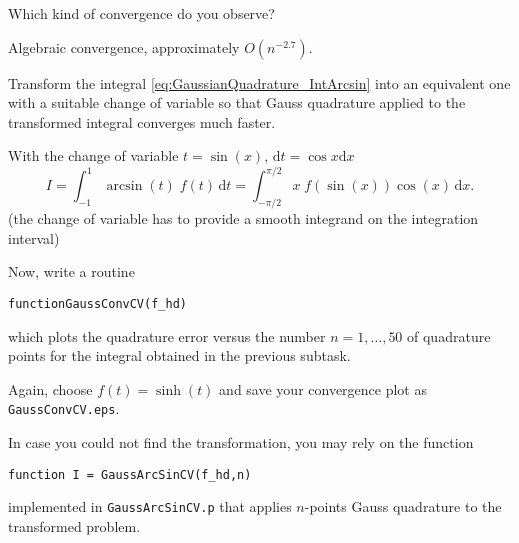 \begin{problem}

\begin{subproblem}[1] \label{subprb:GaussianQuadrature_2}
Which kind of convergence do you observe?

\begin{solution}
Algebraic convergence, approximately $O(n^{-2.7})$.
\end{solution}
\end{subproblem}


\begin{subproblem}[2] \label{subprb:GaussianQuadrature_3}
Transform the integral
\eqref{eq:GaussianQuadrature_IntArcsin} into an equivalent one with a suitable change of variable so that Gauss quadrature
applied to the transformed integral converges much faster.

\begin{solution}
With the change of variable $t=\sin(x)$, $\mathrm{d}t=\cos x\mathrm{d}x$
$$I = \int_{-1}^{1} \arcsin(t)\; f(t) \,\mathrm{d}t  = \int_{-\pi/2}^{\pi/2} x\; f(\sin(x))\cos(x)\,\mathrm{d}x.$$
(the change of variable has to provide a smooth integrand on the integration interval)
\end{solution}
\end{subproblem}


\begin{subproblem}[3] \label{subprb:GaussianQuadrature_4}
Now, write a \Matlab{} routine
\begin{center}
\texttt{function\quad GaussConvCV(f\_hd)}
\end{center}
which plots the quadrature error versus the number $n=1,\ldots,50$ of quadrature points for the integral obtained in the previous subtask.

Again, choose $f(t)=\sinh(t)$ and save your convergence plot as \texttt{GaussConvCV.eps}.

\begin{hint}
In case you could not find the transformation, you may rely on the function
\end{hint}
\begin{center}
\texttt{function \quad I = GaussArcSinCV(f\_hd,n)}
\end{center}
implemented in \texttt{GaussArcSinCV.p} that applies $n$-points Gauss quadrature
to the transformed problem.


\end{subproblem}
\end{problem}
